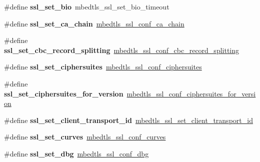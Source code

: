 \begin{DoxyCompactItemize}
\mbox{\label{compat-1_83_8h_aeb06712ab77e205d6f91f102aee0a73b}} 
\#define {\bfseries ssl\+\_\+set\+\_\+bio}~mbedtls\+\_\+ssl\+\_\+set\+\_\+bio\+\_\+timeout
\item 
\mbox{\label{compat-1_83_8h_a965b8193c4d4398560444b62e2d6422f}} 
\#define {\bfseries ssl\+\_\+set\+\_\+ca\+\_\+chain}~\mbox{\hyperlink{ssl_8h_a85c3bb6b682ba361d13de1c0a1eb69fb}{mbedtls\+\_\+ssl\+\_\+conf\+\_\+ca\+\_\+chain}}
\item 
\mbox{\label{compat-1_83_8h_ac3f591f1b1d5d2cb5ea6f2093ae87398}} 
\#define {\bfseries ssl\+\_\+set\+\_\+cbc\+\_\+record\+\_\+splitting}~\mbox{\hyperlink{ssl_8h_a2cafaf0e79682a1152838d4991b59e23}{mbedtls\+\_\+ssl\+\_\+conf\+\_\+cbc\+\_\+record\+\_\+splitting}}
\item 
\mbox{\label{compat-1_83_8h_ab3b2668e6ebd6098cead11e3d14a4dc2}} 
\#define {\bfseries ssl\+\_\+set\+\_\+ciphersuites}~\mbox{\hyperlink{ssl_8h_ac8e4df37cadda8f743ed45501a51fec1}{mbedtls\+\_\+ssl\+\_\+conf\+\_\+ciphersuites}}
\item 
\mbox{\label{compat-1_83_8h_aa294ed60dde14ef2f96cac9bed849532}} 
\#define {\bfseries ssl\+\_\+set\+\_\+ciphersuites\+\_\+for\+\_\+version}~\mbox{\hyperlink{ssl_8h_aa597f5461c48ee6014397c926916e6ae}{mbedtls\+\_\+ssl\+\_\+conf\+\_\+ciphersuites\+\_\+for\+\_\+version}}
\item 
\mbox{\label{compat-1_83_8h_ad3e6b35cb74d434602b3786f0058d52e}} 
\#define {\bfseries ssl\+\_\+set\+\_\+client\+\_\+transport\+\_\+id}~\mbox{\hyperlink{ssl_8h_a15fab95c13a898f32fa69ff2065c1051}{mbedtls\+\_\+ssl\+\_\+set\+\_\+client\+\_\+transport\+\_\+id}}
\item 
\mbox{\label{compat-1_83_8h_a32e6e698dfaa88654eda50f50d61a362}} 
\#define {\bfseries ssl\+\_\+set\+\_\+curves}~\mbox{\hyperlink{ssl_8h_ae1d705b8fc48224262ab92eb5aa4598c}{mbedtls\+\_\+ssl\+\_\+conf\+\_\+curves}}
\item 
\mbox{\label{compat-1_83_8h_aeedf34eff8f4aec44c2f18375f4952da}} 
\#define {\bfseries ssl\+\_\+set\+\_\+dbg}~\mbox{\hyperlink{ssl_8h_ab15dcbe7c7fe2a5c118e7c486c07c921}{mbedtls\+\_\+ssl\+\_\+conf\+\_\+dbg}}

\end{DoxyCompactItemize}
